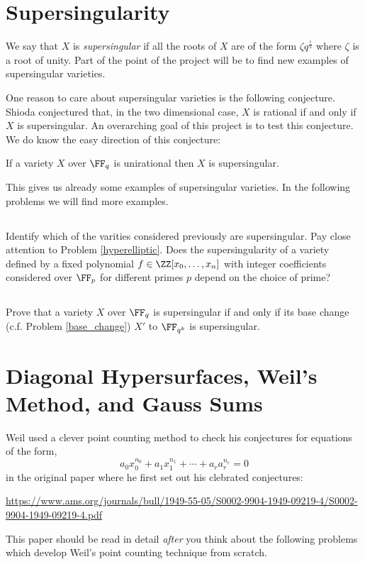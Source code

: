 \documentclass[12pt]{article}
\begin{document}
\section{Supersingularity}

We say that $X$ is \textit{supersingular} if all the roots of $X$ are of the form $\zeta q^{\frac{i}{2}}$ where $\zeta$ is a root of unity. Part of the point of the project will be to find new examples of supersingular varieties. 
\par
One reason to care about supersingular varieties is the following conjecture. Shioda \cite{shioda_conjecture} conjectured that, in the two dimensional case, $X$ is rational if and only if $X$ is supersingular. An overarching goal of this project is to test this conjecture. We do know the easy direction of this conjecture:

\begin{prop}
If a variety $X$ over $\FF_q$ is unirational then $X$ is supersingular. 
\end{prop}

This gives us already some examples of supersingular varieties. In the following problems we will find more examples.

\subsection{}

Identify which of the varities considered previously are supersingular. Pay close attention to Problem \ref{hyperelliptic}. Does the supersingularity of a variety defined by a fixed polynomial $f \in \ZZ[x_0, \dots, x_n]$ with integer coefficients considered over $\FF_p$ for different primes $p$ depend on the choice of prime? 

\subsection{}

Prove that a variety $X$ over $\FF_q$ is supersingular if and only if its base change (c.f. Problem \ref{base_change}) $X'$ to $\FF_{q^k}$ is supersingular.

\section{Diagonal Hypersurfaces, Weil's Method, and Gauss Sums}

Weil used a clever point counting method to check his conjectures for equations of the form,
\[ a_0 x_0^{n_0} + a_1 x_1^{n_1} + \cdots + a_r a_r^{n_r} = 0 \]
in the original paper where he first set out his clebrated conjectures:
\begin{center}
\url{https://www.ams.org/journals/bull/1949-55-05/S0002-9904-1949-09219-4/S0002-9904-1949-09219-4.pdf}
\end{center}
This paper should be read in detail \textit{after} you think about the following problems which develop Weil's point counting technique from scratch.
\end{document}
